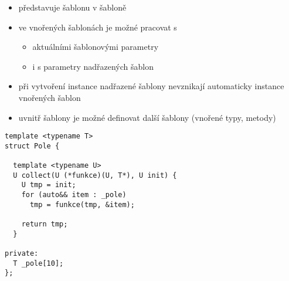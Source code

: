 \begin{frame}[fragile]
\begin{block}{}
\begin{itemize}
\item představuje šablonu v šabloně
\item ve vnořených šablonách je možné pracovat s
\begin{itemize}
\item aktuálními šablonovými parametry
\item i s parametry nadřazených šablon
\end{itemize}

\item při vytvoření instance nadřazené šablony nevznikají automaticky instance vnořených šablon
\end{itemize}
\end{block}
\end{frame}


\begin{frame}[fragile]
\begin{block}{}
\begin{itemize}
\item uvnitř šablony je možné definovat další šablony (vnořené typy, metody)
\end{itemize}
\end{block}

\begin{yesblock}
\begin{lstlisting}[basicstyle=\small]
template <typename T>
struct Pole {
  
  template <typename U>
  U collect(U (*funkce)(U, T*), U init) {
    U tmp = init;
    for (auto&& item : _pole)      
      tmp = funkce(tmp, &item);

    return tmp;
  }

private:
  T _pole[10];
};
\end{lstlisting}
\end{yesblock}
\end{frame}


